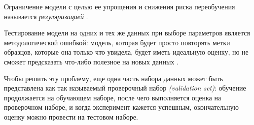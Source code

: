 Ограничение модели с целью ее упрощения и снижения риска переобучения
называется \emph{регуляризацией} \cite{scikitBook}.

Тестирование модели на одних и тех же данных при выборе параметров является
методологической ошибкой: модель, которая будет просто повторять метки
образцов, которые она только что увидела, будет иметь идеальную оценку, но
не сможет предсказать что-либо полезное на новых данных \cite{scikitTuning}.

Чтобы решить эту проблему, еще одна часть набора данных может быть представлена
как так называемый проверочный набор \emph{(validation set)}: обучение продолжается
на обучающем наборе, после чего выполняется оценка на проверочном наборе, и
когда эксперимент кажется успешным, окончательную оценку можно провести на
тестовом наборе.
